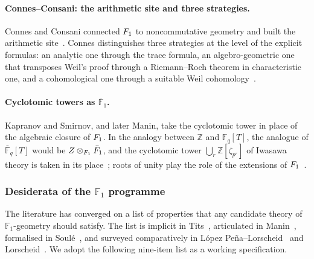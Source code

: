 \paragraph{Connes--Consani: the arithmetic site and three strategies.}
Connes and Consani connected $F_1$ to noncommutative geometry and built the
arithmetic site~\cite{connes08,connes14,connes16}.  Connes distinguishes three
strategies at the level of the explicit formulas: an analytic one through the
trace formula, an algebro-geometric one that transposes Weil's proof through a
Riemann--Roch theorem in characteristic one, and a cohomological one through a
suitable Weil cohomology~\cite{connes15essay}.

\paragraph{Cyclotomic towers as $\bar{\mathbb{F}}_1$.}
Kapranov and Smirnov, and later Manin, take the cyclotomic tower in place of the algebraic closure of $F_1$.
In the analogy between $\mathbb{Z}$ and $\mathbb{F}_q[T]$, the analogue of
$\bar{\mathbb{F}}_q[T]$ would be $Z\otimes_{F_1}\bar{F}_1$, and the cyclotomic tower $\bigcup_r\mathbb{Z}[\zeta_{p^r}]$ of Iwasawa theory is taken in its place~\cite{kapranovsmirnov,manin08}; roots of unity play the role of the extensions of
$F_1$~\cite{kapranovsmirnov}.

\subsubsection{Desiderata of the $\mathbb{F}_1$ programme}
\label{ssec:desiderata}

The literature has converged on a list of properties that any
candidate theory of $\mathbb{F}_1$-geometry should satisfy.  The
list is implicit in Tits~\cite{tits56}, articulated in
Manin~\cite{manin95}, formalised in Soul\'e~\cite{soule03},
and surveyed comparatively in
L\'opez Pe\~na--Lorscheid~\cite{lopezpena09mapping} and
Lorscheid~\cite{lorscheid18}.  We adopt the following nine-item
list as a working specification.

